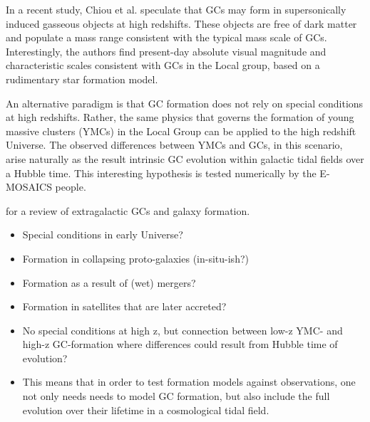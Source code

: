 \documentclass[a4paper,fleqn,usenatbib]{mnras}
\begin{document}
In a recent study, Chiou et al. speculate that GCs may form in supersonically
induced gasseous objects at high redshifts. These objects are free of dark matter 
and populate a mass range consistent with the typical mass scale of GCs. 
Interestingly, the authors find present-day absolute visual magnitude and 
characteristic scales consistent with GCs in the Local group, based on a 
rudimentary star formation model.

An alternative paradigm is that GC formation does not rely on special conditions
at high redshifts. Rather, the same physics that governs the formation of young 
massive clusters (YMCs) in the Local Group can be applied to the high redshift
Universe. The observed differences between YMCs and GCs, in this scenario, arise
naturally as the result intrinsic GC evolution within galactic tidal fields over
a Hubble time. This interesting hypothesis is tested numerically by the E-MOSAICS
people.


\citet{2006ARA&A..44..193B} for a review of extragalactic GCs and galaxy
formation. 





%
%


\begin{itemize}
    \item Special conditions in early Universe?
    \item Formation in collapsing proto-galaxies (in-situ-ish?)
    \item Formation as a result of (wet) mergers?
    \item Formation in satellites that are later accreted?
    \item No special conditions at high z, but connection between low-z YMC-
        and high-z GC-formation where differences could result from Hubble time
        of evolution?
    \item This means that in order to test formation models against observations,
        one not only needs needs to model GC formation, but also include the full
        evolution over their lifetime in a cosmological tidal field.
\end{itemize}
\end{document}
